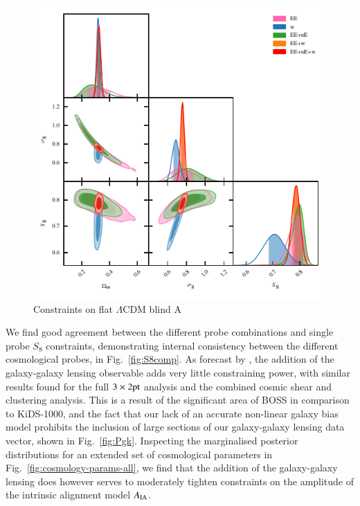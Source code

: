 \begin{figure}
	\begin{center}
		\includegraphics[width=\columnwidth]{Parameter_Plots/omegam_sigma8_s8_blind_A}
		\caption{Constraints on flat $\Lambda$CDM blind A}
		\label{fig:cosmology-params}
	\end{center}
\end{figure}

We find good agreement between the different probe combinations and single probe $S_8$ constraints, demonstrating internal consistency between the different cosmological probes, in Fig.~\ref{fig:S8comp}.  As forecast by \citet{joachimi/etal:inprep}, the addition of the galaxy-galaxy lensing observable adds very little constraining power, with similar results found for the full $3\times2{\rm pt}$ analysis and the combined cosmic shear and clustering analysis.   This is a result of the significant area of BOSS in comparison to KiDS-1000, and the fact that our lack of an accurate non-linear galaxy bias model prohibits the inclusion of large sections of our galaxy-galaxy lensing data vector, shown in Fig.~\ref{fig:Pgk}.   Inspecting the marginalised posterior distributions for an extended set of cosmological parameters in Fig.~\ref{fig:cosmology-params-all}, we find that the addition of the galaxy-galaxy lensing does however serves to moderately tighten constraints on the amplitude of the intrinsic alignment model $A_{\rm IA}$.   

